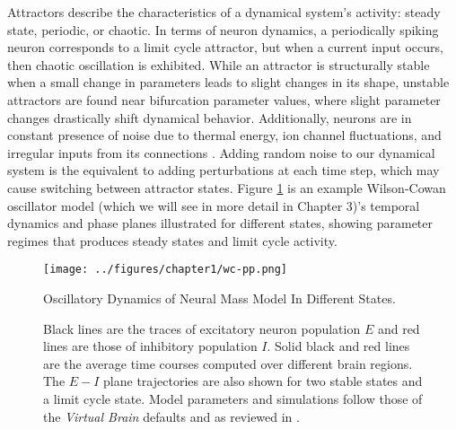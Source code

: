 Attractors describe the characteristics of a dynamical system's activity: steady state, periodic, or chaotic. In terms of neuron dynamics, a periodically spiking neuron corresponds to a limit cycle attractor, but when a current input occurs, then chaotic oscillation is exhibited. While an attractor is structurally stable when a small change in parameters leads to slight changes in its shape, unstable attractors are found near bifurcation parameter values, where slight parameter changes drastically shift dynamical behavior. Additionally, neurons are in constant presence of noise due to thermal energy, ion channel fluctuations, and irregular inputs from its connections \cite{faisal2008noise,mivsic2010brain}. Adding random noise to our dynamical system is the equivalent to adding perturbations at each time step, which may cause switching between attractor states. Figure \ref{fig:wc-pp} is an example Wilson-Cowan oscillator model (which we will see in more detail in Chapter 3)'s temporal dynamics and phase planes illustrated for different states, showing parameter regimes that produces steady states and limit cycle activity. 

\begin{figure}[htbp]
	\centering
	\texttt{[image: ../figures/chapter1/wc-pp.png]}
	\caption{Oscillatory Dynamics of Neural Mass Model In Different States.}
	\caption*{Black lines are the traces of excitatory neuron population $E$ and red lines are those of inhibitory population $I$. Solid black and red lines are the average time courses computed over different brain regions. The $E-I$ plane trajectories are also shown for two stable states and a limit cycle state. Model parameters and simulations follow those of the \emph{Virtual Brain} defaults and as reviewed in \cite{sanz-leon_mathematical_2015}.}
	\label{fig:wc-pp}
\end{figure}

